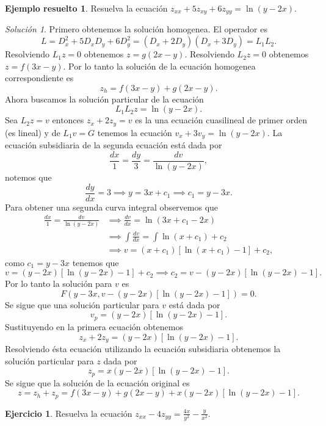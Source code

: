\documentclass[11pt,letterpaper,draft]{report}
\theoremstyle{plain}
\theoremstyle{definition}
\newtheorem{solved}[theorem]{Ejemplo resuelto}
\newtheorem{exercise}[theorem]{Ejercicio}
\theoremstyle{remark}
\newtheorem*{solution}{Solución}
\newcommand\<{\langle}
\renewcommand\>{\rangle}
\begin{document}
\begin{solved}
  Resuelva la ecuación $z_{xx} + 5z_{xy} + 6z_{yy} =
  \ln(y-2x)$.
  \begin{solution}
    Primero obtenemos la solución homogenea. El operador es
    \[
    L = D_x^2 + 5D_xD_y + 6D_y^2 = (D_x+2D_y)(D_x+3D_y) =
    L_1L_2.
    \] 
    Resolviendo $L_1z=0$ obtenemos $z = g(2x-y)$.
    Resolviendo $L_2z=0$ obtenemos $z = f(3x-y)$. Por lo
    tanto la solución de la ecuación homogenea
    correspondiente es
    \[
    z_h = f(3x-y) + g(2x-y).
    \] 
    Ahora buscamos la solución particular de la ecuación
    \[
    L_1L_2z = \ln(y-2x).
    \] 
    Sea $L_2z = v$ entonces $z_x + 2z_y = v$ es la una
    ecuación cuasilineal de primer orden (es lineal) y de
    $L_1v = G$ tenemos la ecuación $v_x + 3v_y = \ln(y-2x)$.
    La ecuación subsidiaria de la segunda ecuación está dada
    por
    \[
    \frac{dx}{1} = \frac{dy}{3} = \frac{dv}{\ln(y-2x)},
    \] 
    notemos que
    \[
    \frac{dy}{dx} = 3 \implies y = 3x + c_1 \implies c_1 = y
    - 3x.
    \] 
    Para obtener una segunda curva integral observemos que
    \begin{align*}
      \frac{dx}{1} = \frac{dv}{\ln(y-2x)}
      &\implies
      \frac{dv}{dx} = \ln(3x+c_1-2x)\\
      &\implies \int \frac{dv}{dx} = \int \ln(x+c_1) + c_2\\
      &\implies v = (x+c_1)[\ln(x+c_1)-1] + c_2,
    \end{align*}
    como $c_1 = y - 3x$ tenemos que
    \[
    v = (y-2x)[\ln(y-2x)-1] + c_2 \implies c_2 = v -
    (y-2x)[\ln(y-2x)-1].
    \] 
    Por lo tanto la solución para $v$ es
    \[
    F(y-3x, v-(y-2x)[\ln(y-2x)-1]) = 0.
    \] 
    Se sigue que una solución particular para $v$ está dada
    por
    \[
    v_p = (y-2x)[\ln(y-2x)-1].
    \] 
    Sustituyendo en la primera ecuación obtenemos
    \[
    z_x + 2z_y = (y-2x)[\ln(y-2x)-1].
    \] 
    Resolviendo ésta ecuación utilizando la ecuación
    subsidiaria obtenemos la solución particular para $z$ 
    dada por
    \[
    z_p = x(y-2x)[\ln(y-2x)-1].
    \] 
    Se sigue que la solución de la ecuación original es
    \[
    z = z_h + z_p = f(3x-y) + g(2x-y) +
    x(y-2x)[\ln(y-2x)-1].
    \] 
  \end{solution}
\end{solved}

\begin{exercise}
  Resuelva la ecuación $\displaystyle z_{xx} - 4z_{yy} = \frac{4x}{y^2} -
  \frac{y}{x^2}$.
\end{exercise}
\end{document}
